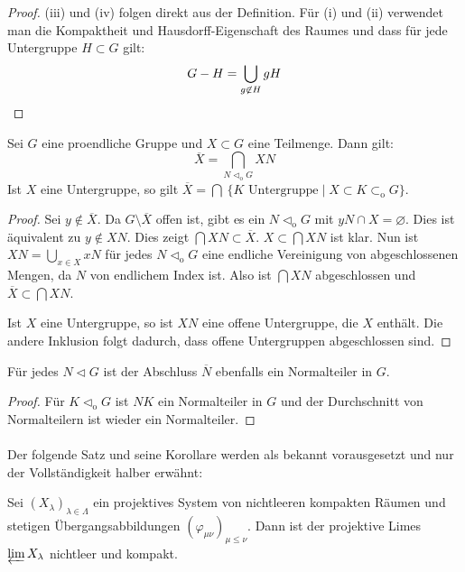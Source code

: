 \documentclass[11pt,a4paper,openany]{memoir}
\begin{document}
\begin{proof}
(iii) und (iv) folgen direkt aus der Definition. Für (i) und (ii) verwendet man die Kompaktheit und Hausdorff-Eigenschaft des Raumes und dass für jede Untergruppe $H\subset G$ gilt:
\[ G- H = \bigcup_{g\not\in H} gH \qedhere \]
\end{proof}
\fi

\begin{proposition}\label{1.2.iii}
Sei $G$ eine proendliche Gruppe und $X\subset G$ eine Teilmenge. Dann gilt:
\[ \overline{X} = \bigcap_{N\lhd_\text{o} G} XN \]
Ist $X$ eine Untergruppe, so gilt $\overline{X} = \bigcap\ \{K\text{ Untergruppe} \mid X\subset K\subset_\text{o}G \}$.
\end{proposition}

\begin{proof}
Sei $y\not\in\overline{X}$. Da $G\setminus\overline{X}$ offen ist, gibt es ein $N\lhd_\text{o}G$ mit $yN\cap X=\varnothing$. Dies ist äquivalent zu $y\not\in XN$. Dies zeigt $\bigcap XN\subset\overline{X}$. $X\subset\bigcap XN$ ist klar. Nun ist $XN=\bigcup_{x\in X} xN$ für jedes $N\lhd_\text{o}G$ eine endliche Vereinigung von abgeschlossenen Mengen, da $N$ von endlichem Index ist. Also ist $\bigcap XN$ abgeschlossen und $\overline{X}\subset \bigcap XN$.

Ist $X$ eine Untergruppe, so ist $XN$ eine offene Untergruppe, die $X$ enthält. Die andere Inklusion folgt dadurch, dass offene Untergruppen abgeschlossen sind.
\end{proof}

\begin{corollary}
Für jedes $N\lhd G$ ist der Abschluss $\overline{N}$ ebenfalls ein Normalteiler in $G$.
\end{corollary}

\begin{proof}
Für $K\lhd_\text{o}G$ ist $NK$ ein Normalteiler in $G$ und der Durchschnitt von Normalteilern ist wieder ein Normalteiler.
\end{proof}

\paragraph{} Der folgende Satz und seine Korollare werden als bekannt vorausgesetzt und nur der Voll\-stän\-dig\-keit halber erwähnt:

\begin{proposition}\label{1.4}
Sei $(X_\lambda)_{\lambda\in\Lambda}$ ein projektives System von nichtleeren kompakten Räumen und stetigen Ü\-ber\-gangs\-ab\-bil\-dun\-gen $(\varphi_{\mu\nu})_{\mu\leq\nu}$. Dann ist der projektive Limes $\varprojlim X_\lambda$ nichtleer und kompakt.
\end{proposition}
\end{document}
